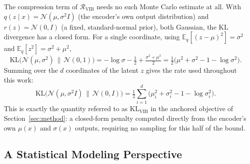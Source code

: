 \documentclass[11pt,a4paper,oneside]{article}
\begin{document}
The compression term of $\mathcal R_{\text{VIB}}$ needs no such Monte Carlo estimate at all. With
$q(z\mid x)=\mathcal N(\mu,\sigma^2 I)$ (the encoder's own output distribution) and $r(z)=\mathcal
N(0,I)$ (a fixed, standard-normal prior), both Gaussian, the KL divergence has a closed form. For a
single coordinate, using $\mathbb E_q[(z-\mu)^2]=\sigma^2$ and $\mathbb E_q[z^2]=\sigma^2+\mu^2$,
\[
\mathrm{KL}\big(\mathcal N(\mu,\sigma^2)\,\|\,\mathcal N(0,1)\big)
= -\log\sigma - \tfrac12 + \tfrac{\sigma^2+\mu^2}{2}
= \tfrac12\big(\mu^2+\sigma^2-1-\log\sigma^2\big).
\]
Summing over the $d$ coordinates of the latent $z$ gives the rate used throughout this work:
\begin{equation}
\mathrm{KL}\big(\mathcal N(\mu,\sigma^2I)\,\|\,\mathcal N(0,I)\big)
= \tfrac12 \sum_{i=1}^{d} \big(\mu_i^2 + \sigma_i^2 - 1 - \log\sigma_i^2\big).
\label{eq:kl-closed-form}
\end{equation}
This is exactly the quantity referred to as $\mathrm{KL}_{\text{VIB}}$ in the anchored objective of
Section~\ref{sec:method}: a closed-form penalty computed directly from the encoder's own $\mu(x)$ and
$\sigma(x)$ outputs, requiring no sampling for this half of the bound.

\subsection{A Statistical Modeling Perspective}
\label{sec:stat-model}
\end{document}
